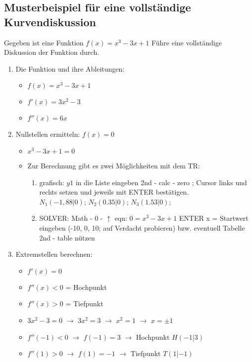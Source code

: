 \newpage
\subsection{Musterbeispiel für eine vollständige Kurvendiskussion}

Gegeben ist eine Funktion $f(x)=x^3-3x+1$ Führe eine vollständige Diskussion der Funktion durch.\\

\begin{enumerate}
    \item Die Funktion und ihre Ableitungen: \begin{itemize}
              \item $f(x)=x^3-3x+1$
              \item $f'(x) = 3x^2-3$
              \item $f''(x) = 6x$
          \end{itemize}
    \item Nullstellen ermitteln: $f(x)=0$ \begin{itemize}
              \item $x^3-3x+1=0$
              \item Zur Berechnung gibt es zwei Möglichkeiten mit dem TR: \begin{enumerate}
                        \item grafisch: $y1$ in die Liste eingeben 2nd - calc - zero ; Cursor links und rechts setzen und jeweils  mit ENTER bestätigen.\\ $N_1(-1,88|0)$; $N_2(0.35|0)$; $N_3(1.53|0)$;
                        \item SOLVER: Math - 0 - $\uparrow$ eqn: $0=x^3-3x+1$ ENTER x = Startwert eingeben (-10, 0, 10; auf Verdacht probieren) bzw. eventuell Tabelle 2nd - table nützen 
                    \end{enumerate}
          \end{itemize}
    \item Extremstellen berechnen: \begin{itemize}
        \item $f'(x)=0$
        \item $f''(x) < 0$ = Hochpunkt
        \item $f''(x) > 0$ = Tiefpunkt
        \item $3x^2-3=0$ $\rightarrow$ $3x^2=3$ $\rightarrow$ $x^2=1$ $\rightarrow$ $x = \pm 1$
        \item $f''(-1)<0$ $\rightarrow$ $f(-1)=3$ $\rightarrow$ Hochpunkt $H(-1|3)$
        \item $f''(1)>0$ $\rightarrow$ $f(1)=-1$ $\rightarrow$ Tiefpunkt $T(1|-1)$

\end{itemize}
\end{enumerate}
